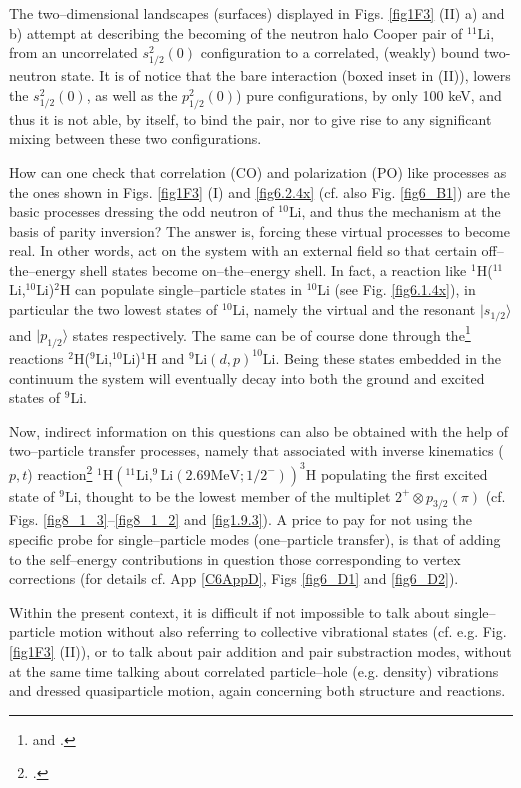  The two--dimensional landscapes (surfaces) displayed in Figs. \ref{fig1F3} (II) a) and b) attempt at describing the becoming of the neutron halo     Cooper pair  of  $^{11}$Li,  from an uncorrelated $s_{1/2}^2(0)$  configuration to a  correlated, (weakly) bound two-neutron state. It is of notice that  the bare interaction (boxed inset in  (II)), lowers the $s_{1/2}^2(0)$, as well as the $p_{1/2}^2(0)$) pure  configurations,  by  only 100 keV, and thus it is not able, by itself,  to bind the pair, nor to give rise to any significant mixing between these two configurations. 

How can one check that correlation (CO) and polarization (PO) like processes as the ones shown in Figs. \ref{fig1F3} (I) and \ref{fig6.2.4x} (cf. also Fig. \ref{fig6_B1}) are the basic processes dressing the odd neutron of $^{10}$Li, and thus the mechanism at the basis of parity inversion? The answer is, forcing these virtual processes to become real. In other words, act on the system with an external field so that certain off--the--energy shell states become on--the--energy shell. In fact, a reaction like $^1$H($^{11}$Li,$^{10}$Li)$^2$H can populate single--particle states in $^{10}$Li (see Fig. \ref{fig6.1.4x}), in particular the two lowest states of $^{10}$Li, namely the virtual and the resonant $|s_{1/2}\rangle$ and $|p_{1/2}\rangle$ states respectively. The same can be of course done through the\footnote{\cite{Orrigo:09} and \cite{Jeppesen:04,Cavallaro:17}.} reactions $^2$H($^9$Li,$^{10}$Li)$^1$H and $^9$Li$(d,p)^{10}$Li. Being these states embedded in the continuum the system will eventually decay into both the ground and excited states of $^9$Li. 



Now,  indirect information on this questions can also be obtained	 with the help of two--particle transfer processes, namely that associated with inverse kinematics ($p,t$) reaction\footnote{\cite{Tanihata:08}.} $^1\text{H}(^{11}\text{Li},^{9}\text{Li}(2.69\text{MeV};1/2^-))^3$H populating the first excited state of $^9$Li, thought to be the lowest member of the multiplet $2^+\otimes p_{3/2}(\pi)$  (cf. Figs. \ref{fig8_1_3}--\ref{fig8_1_2} and \ref{fig1.9.3}).
 A price to pay for not using the specific probe for single--particle modes (one--particle transfer), is that of adding to the self--energy contributions in question those corresponding to vertex corrections (for details cf. App \ref{C6AppD}, Figs \ref{fig6_D1} and \ref{fig6_D2}). 

Within the present context, it is difficult if not impossible to talk about single--particle motion without also referring to collective vibrational states (cf. e.g. Fig. \ref{fig1F3} (II)), or to talk about pair addition and pair substraction modes, without at the same time talking about correlated particle--hole (e.g. density) vibrations and dressed quasiparticle motion,  again concerning both  structure and reactions. 

